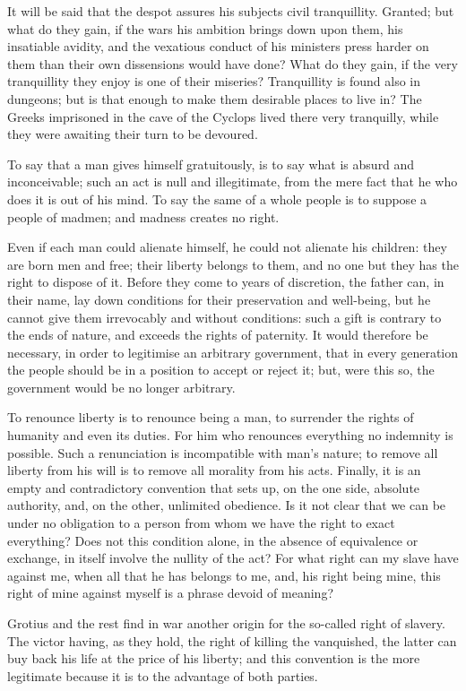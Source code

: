 \documentclass[12pt]{book}
\begin{document}
It will be said that the despot assures his subjects civil tranquillity. Granted; but what do they gain, if the wars his ambition brings down upon them, his insatiable avidity, and the vexatious conduct of his ministers press harder on them than their own dissensions would have done? What do they gain, if the very tranquillity they enjoy is one of their miseries? Tranquillity is found also in dungeons; but is that enough to make them desirable places to live in? The Greeks imprisoned in the cave of the Cyclops lived there very tranquilly, while they were awaiting their turn to be devoured.

To say that a man gives himself gratuitously, is to say what is absurd and inconceivable; such an act is null and illegitimate, from the mere fact that he who does it is out of his mind. To say the same of a whole people is to suppose a people of madmen; and madness creates no right.

Even if each man could alienate himself, he could not alienate his children: they are born men and free; their liberty belongs to them, and no one but they has the right to dispose of it. Before they come to years of discretion, the father can, in their name, lay down conditions for their preservation and well-being, but he cannot give them irrevocably and without conditions: such a gift is contrary to the ends of nature, and exceeds the rights of paternity. It would therefore be necessary, in order to legitimise an arbitrary government, that in every generation the people should be in a position to accept or reject it; but, were this so, the government would be no longer arbitrary.

To renounce liberty is to renounce being a man, to surrender the rights of humanity and even its duties. For him who renounces everything no indemnity is possible. Such a renunciation is incompatible with man's nature; to remove all liberty from his will is to remove all morality from his acts. Finally, it is an empty and contradictory convention that sets up, on the one side, absolute authority, and, on the other, unlimited obedience. Is it not clear that we can be under no obligation to a person from whom we have the right to exact everything? Does not this condition alone, in the absence of equivalence or exchange, in itself involve the nullity of the act? For what right can my slave have against me, when all that he has belongs to me, and, his right being mine, this right of mine against myself is a phrase devoid of meaning?

Grotius and the rest find in war another origin for the so-called right of slavery. The victor having, as they hold, the right of killing the vanquished, the latter can buy back his life at the price of his liberty; and this convention is the more legitimate because it is to the advantage of both parties.
\end{document}
